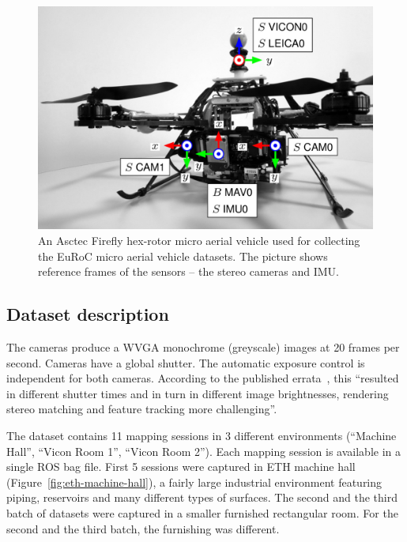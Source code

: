 \begin{figure}
    \centering
    \includegraphics[width=\textwidth]{../img/euroc_platform.jpg}
    \caption[A micro aerial vehicle]{An Asctec Firefly hex-rotor micro aerial vehicle used for collecting the EuRoC micro aerial vehicle datasets. The picture shows reference frames of the sensors -- the stereo cameras and \gls{IMU}.}
    \label{fig:euroc_platform}
\end{figure}

\subsection{Dataset description}

The cameras produce a WVGA monochrome (greyscale) images at 20 frames per second. Cameras have a global shutter. The automatic exposure control is independent for both cameras. According to the published errata~\citep{Burri2016}, this ``resulted in different shutter times and in turn in different image brightnesses, rendering stereo matching and feature tracking more challenging''.

The dataset contains 11 mapping sessions in 3 different environments (``Machine Hall'', ``Vicon Room 1'', ``Vicon Room 2''). Each mapping session is available in a single \gls{ROS} bag file. First 5 sessions were captured in ETH machine hall (Figure~\ref{fig:eth-machine-hall}), a fairly large industrial environment featuring piping, reservoirs and many different types of surfaces. The second and the third batch of datasets were captured in a smaller furnished rectangular room. For the second and the third batch, the furnishing was different.

